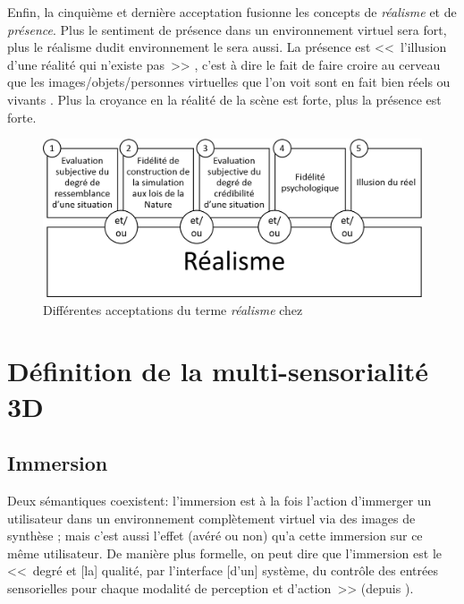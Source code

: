 	\par Enfin, la cinquième et dernière acceptation fusionne les concepts de \textit{réalisme} et de \textit{présence}. Plus le sentiment de présence dans un environnement virtuel sera fort, plus le réalisme dudit environnement le sera aussi. La présence est <<~l'illusion d'une réalité qui n'existe pas~>> \citep{stoffregen_one_2003}, c'est à dire le fait de faire croire au cerveau que les images/objets/personnes virtuelles que l'on voit sont en fait bien réels ou vivants \citep{burkhardt_realite_2003}. Plus la croyance en la réalité de la scène est forte, plus la présence est forte.
	
	\begin{figure}
		\centering
		\includegraphics[scale=.65]{Figures/AcceptationsRealisme}
		\caption{Différentes acceptations du terme \textit{réalisme} chez \cite{fuchs_traite_2003}}
		\label{fig:acceptations_realisme}
	\end{figure}
	
	\section{Définition de la multi-sensorialité 3D}
	\subsection{Immersion}
	\par Deux sémantiques coexistent: l'immersion est à la fois l'action d'immerger un utilisateur dans un environnement complètement virtuel via des images de synthèse ; mais c'est aussi l'effet (avéré ou non) qu'a cette immersion sur ce même utilisateur. De manière plus formelle, on peut dire que l'immersion est le <<~degré et [la] qualité, par l'interface [d'un] système, du contrôle des entrées sensorielles pour chaque modalité de perception et d'action~>> (depuis \citep{fuchs_traite_2003}).
	
